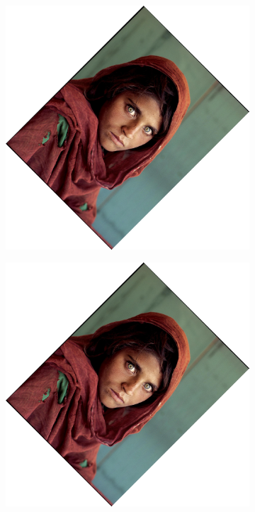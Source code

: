 \documentclass{article}
\begin{document}
\begin{figure}[H]
    \centering
    \begin{subfigure}{.3\textwidth}
        \centering
        \includegraphics[scale=0.04]{q1/output/similar_2_0.5_2.jpg}
        \subcaption{}
    \end{subfigure}
    \begin{subfigure}{.3\textwidth}
        \centering
        \includegraphics[scale=0.04]{q1/output/similar_2_1_2.jpg}

\end{subfigure}
\end{figure}
\end{document}
